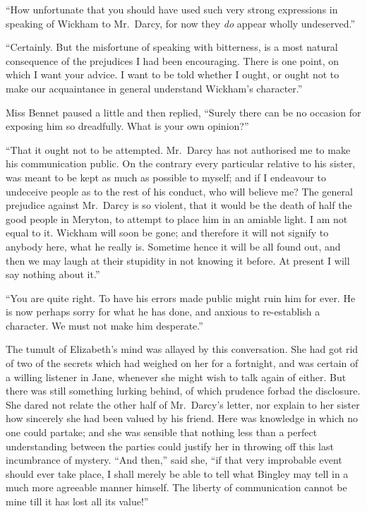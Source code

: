 “How unfortunate that you should have used such very
strong expressions in speaking of Wickham to Mr.\ Darcy,
for now they \textit{do} appear wholly undeserved.”

“Certainly. But the misfortune of speaking with
bitterness, is a most natural consequence of the prejudices
I had been encouraging. There is one point, on which
I want your advice. I want to be told whether I ought,
or ought not to make our acquaintance in general understand
Wickham’s character.”

Miss Bennet paused a little and then replied, “Surely
there can be no occasion for exposing him so dreadfully.
What is your own opinion?”

“That it ought not to be attempted. Mr.\ Darcy has
not authorised me to make his communication public.
On the contrary every particular relative to his sister,
was meant to be kept as much as possible to myself;
and if I endeavour to undeceive people as to the rest
of his conduct, who will believe me? The general prejudice
against Mr.\ Darcy is so violent, that it would be
the death of half the good people in Meryton, to attempt
to place him in an amiable light. I am not equal to it.
Wickham will soon be gone; and therefore it will not
signify to anybody here, what he really is. Sometime
hence it will be all found out, and then we may laugh
at their stupidity in not knowing it before. At present
I will say nothing about it.”

“You are quite right. To have his errors made public
might ruin him for ever. He is now perhaps sorry for
what he has done, and anxious to re-establish a character.
We must not make him desperate.”

The tumult of Elizabeth’s mind was allayed by this
conversation. She had got rid of two of the secrets which
had weighed on her for a fortnight, and was certain of
a willing listener in Jane, whenever she might wish to
talk again of either. But there was still something lurking
behind, of which prudence forbad the disclosure. She dared
not relate the other half of Mr.\ Darcy’s letter, nor explain to
her sister how sincerely she had been valued by his friend.
Here was knowledge in which no one could partake;
and she was sensible that nothing less than a perfect
understanding between the parties could justify her in
throwing off this last incumbrance of mystery. “And
then,” said she, “if that very improbable event should
ever take place, I shall merely be able to tell what Bingley
may tell in a much more agreeable manner himself. The
liberty of communication cannot be mine till it has lost
all its value!”


